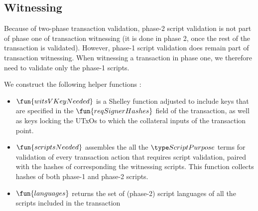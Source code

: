 \subsection{Witnessing}
\label{sec:wits}

Because of two-phase transaction validation, phase-2 script validation is not part of phase one of transaction witnessing
(it is done in phase 2, once the rest of the transaction is validated).
However, phase-1 script validation does remain part of transaction witnessing.
When witnessing a transaction in phase one, we therefore need to validate only the phase-1 scripts.

We construct the following helper functions :

\begin{itemize}
  \item $\fun{witsVKeyNeeded}$ is a Shelley function adjusted to include
  keys that are specified in the $\fun{reqSignerHashes}$ field of the transaction,
  as well as keys locking the UTxOs to which the collateral inputs of the transaction point.

  \item $\fun{scriptsNeeded}$ assembles the all the $\ScriptPurpose$ terms
  for validation of every transaction action that requires script validation,
  paired with the hashes of corresponding the witnessing scripts.
  This function collects hashes of both phase-1 and phase-2 scripts.

  \item $\fun{languages}$ returns the set of (phase-2) script languages
  of all the scripts included in the transaction
\end{itemize}

